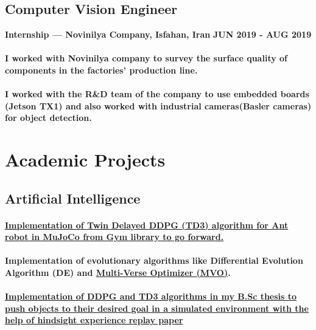 \documentclass[a4paper]{article}
\begin{document}
        \subsection{Computer Vision Engineer}
        {\bfseries\small Internship — Novinilya Company, Isfahan, Iran}
        \hfill
        {\bfseries\small JUN 2019 - AUG 2019}\nopagebreak
        
        \paragraph{I worked with Novinilya company to survey the surface quality of components in the factories'  production line.}
        \paragraph{I worked with the R\&D team of the company to use embedded boards (Jetson TX1) and also worked with industrial cameras(Basler cameras) for object detection.}

    \section{Academic Projects}

        \subsection{Artificial Intelligence}

            \paragraph{\href{https://github.com/ake1999/TD3_Ant_v4}{Implementation of Twin Delayed DDPG (TD3) algorithm for Ant robot in MuJoCo from Gym library to go forward.}}
            \paragraph{Implementation of evolutionary algorithms like Differential Evolution Algorithm (DE) and \href{https://github.com/ake1999/MVO_MATLAB}{Multi-Verse Optimizer (MVO)}.}
            \paragraph{\href{https://github.com/ake1999/aarm}{Implementation of DDPG and TD3 algorithms in my B.Sc thesis to push objects to their desired goal in a simulated environment with the help of hindsight experience replay paper}}
\end{document}
